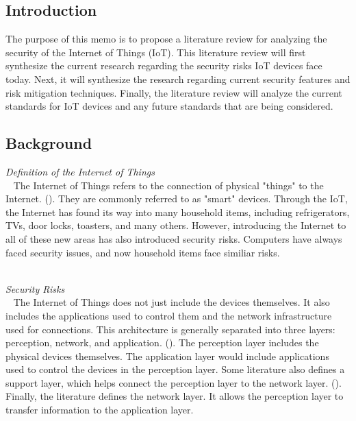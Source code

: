 \documentclass[letterpaper, 12pt]{texMemo}
\begin{document}
\maketitle
\begin{flushleft}
\subsection*{Introduction}
The purpose of this memo is to propose a literature review for analyzing the security of the Internet of Things (IoT). 
This literature review will first synthesize the current research regarding the security risks IoT devices face today. 
Next, it will synthesize the research regarding current security features and risk mitigation techniques.  
Finally, the literature review will analyze the current standards for IoT devices and any future standards that are being considered.  

\subsection*{Background}
\textit{Definition of the Internet of Things}\\ 
~\newline
  The Internet of Things refers to the connection of physical "things" to the Internet. (\cite{Kozlov}). They are commonly referred to as "smart" devices. 
Through the IoT, the Internet has found its way into many household items, including refrigerators, TVs, door locks, toasters, and many others. 
However, introducing the Internet to all of these new areas has also introduced security risks. Computers have always faced security issues, and now household items
face similiar risks.\\ 
~\newline

\textit{Security Risks}\\
~\newline
The Internet of Things does not just include the devices themselves. It also includes the applications used to control them and the network infrastructure used for connections. 
This architecture is generally separated into three layers: perception, network, and application. (\cite{Zhao6746513}). The perception layer includes the physical devices themselves. 
The application layer would include applications used to control the devices in the perception layer. Some literature also defines a support layer, which helps connect the perception layer
to the network layer. (\cite{Suo6188257}). Finally, the literature defines the network layer. It allows the perception layer to transfer information to the application layer.\\ 
~\newline


\end{flushleft}
\end{document}
